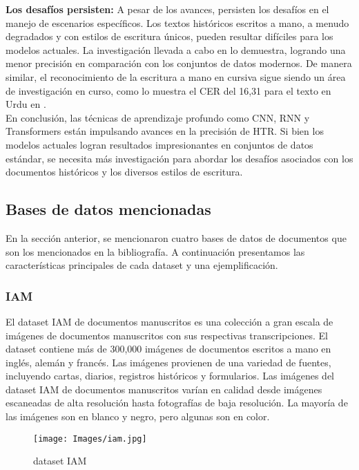 \documentclass{article}
\begin{document}
\textbf{Los desafíos persisten:} A pesar de los avances, persisten los desafíos en el manejo de escenarios específicos. Los textos históricos escritos a mano, a menudo degradados y con estilos de escritura únicos, pueden resultar difíciles para los modelos actuales. La investigación llevada a cabo en \cite{9} lo demuestra, logrando una menor precisión en comparación con los conjuntos de datos modernos. De manera similar, el reconocimiento de la escritura a mano en cursiva sigue siendo un área de investigación en curso, como lo muestra el CER del 16,31  para el texto en Urdu en \cite{3}. \\[10pt]

En conclusión, las técnicas de aprendizaje profundo como CNN, RNN y Transformers están impulsando avances en la precisión de HTR. Si bien los modelos actuales logran resultados impresionantes en conjuntos de datos estándar, se necesita más investigación para abordar los desafíos asociados con los documentos históricos y los diversos estilos de escritura.

\subsection{Bases de datos mencionadas}
En la sección anterior, se mencionaron cuatro bases de datos de documentos que son los mencionados en la bibliografía. A continuación presentamos las características principales de cada dataset y una ejemplificación.

\subsubsection{IAM}
El dataset IAM \cite{10} de documentos manuscritos es una colección a gran escala de imágenes de documentos manuscritos con sus respectivas transcripciones. El dataset contiene más de 300,000 imágenes de documentos escritos a mano en inglés, alemán y francés. Las imágenes provienen de una variedad de fuentes, incluyendo cartas, diarios, registros históricos y formularios. Las imágenes del dataset IAM de documentos manuscritos varían en calidad desde imágenes escaneadas de alta resolución hasta fotografías de baja resolución. La mayoría de las imágenes son en blanco y negro, pero algunas son en color.

\begin{figure}[h]
    \centering
    \texttt{[image: Images/iam.jpg]}
    \caption{dataset IAM}
    \label{fig:enter-label}
\end{figure}
\end{document}

